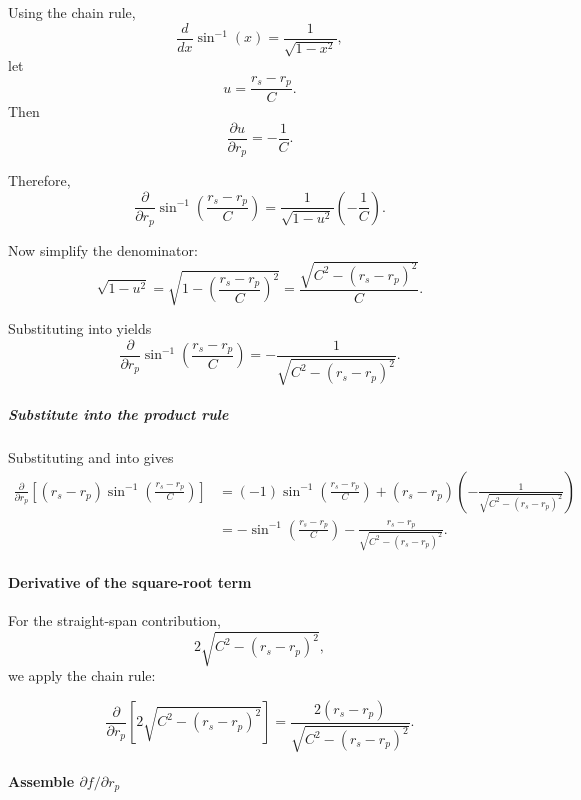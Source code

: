 \documentclass[11pt]{article}
\numberwithin{equation}{section}
\begin{document}
Using the chain rule,
\[
\frac{d}{dx}\sin^{-1}(x)=\frac{1}{\sqrt{1-x^2}},
\]
let
\[
u=\frac{r_s-r_p}{C}.
\]
Then
\[
\frac{\partial u}{\partial r_p} = -\frac{1}{C}.
\]

Therefore,
\begin{equation}
\frac{\partial}{\partial r_p}\sin^{-1}\!\left(\frac{r_s-r_p}{C}\right)
=
\frac{1}{\sqrt{1-u^2}}\left(-\frac{1}{C}\right).
\label{eq:asin_chain_rp_step1}
\end{equation}

Now simplify the denominator:
\[
\sqrt{1-u^2}
=
\sqrt{1-\left(\frac{r_s-r_p}{C}\right)^2}
=
\frac{\sqrt{C^2-(r_s-r_p)^2}}{C}.
\]

Substituting into  yields
\begin{equation}
\frac{\partial}{\partial r_p}\sin^{-1}\!\left(\frac{r_s-r_p}{C}\right)
=
-\frac{1}{\sqrt{C^2-(r_s-r_p)^2}}.
\label{eq:asin_chain_rp_final}
\end{equation}

\subparagraph{Substitute into the product rule}

Substituting  and  into
 gives
\begin{align}
\frac{\partial}{\partial r_p}
\left[
(r_s-r_p)\sin^{-1}\!\left(\frac{r_s-r_p}{C}\right)
\right]
&=
(-1)\sin^{-1}\!\left(\frac{r_s-r_p}{C}\right)
+
(r_s-r_p)\left(
-\frac{1}{\sqrt{C^2-(r_s-r_p)^2}}
\right)
\nonumber\\[6pt]
&=
-\sin^{-1}\!\left(\frac{r_s-r_p}{C}\right)
-
\frac{r_s-r_p}{\sqrt{C^2-(r_s-r_p)^2}}.
\label{eq:prod_asin_rp_final}
\end{align}

\paragraph{Derivative of the square-root term}

For the straight-span contribution,
\[
2\sqrt{C^2-(r_s-r_p)^2},
\]
we apply the chain rule:

\begin{equation}
\frac{\partial}{\partial r_p}
\left[
2\sqrt{C^2-(r_s-r_p)^2}
\right]
=
\frac{2(r_s-r_p)}
{\sqrt{C^2-(r_s-r_p)^2}}.
\label{eq:sqrt_general_rp}
\end{equation}

\paragraph{Assemble $\partial f/\partial r_p$}
\end{document}
